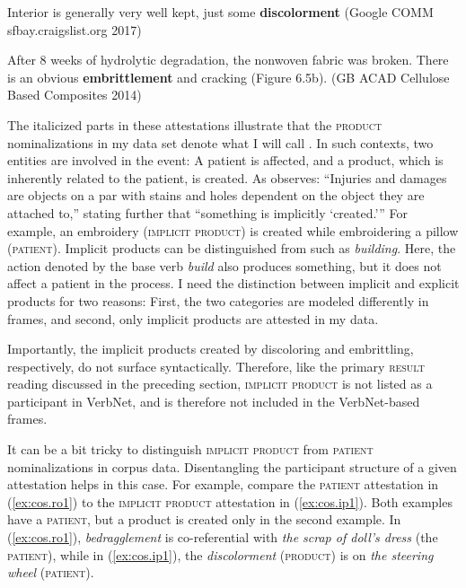 \begin{exe}
  \ex 
  \begin{xlist}
  \item \label{ex:cos.ip1}  Interior is generally very well kept, just some \textbf{discolorment}  {\small(Google COMM sfbay.craigslist.org 2017)}
  \item \label{ex:cos.ip2} After 8 weeks of hydrolytic degradation, the nonwoven fabric was broken. There is an obvious \textbf{embrittlement} and cracking  (Figure 6.5b). {\small(\acs{GB} ACAD Cellulose Based Composites 2014)}
  \end{xlist}
\end{exe}

\noindent The italicized parts in these attestations illustrate that the \textsc{product} nominalizations in my data set denote what I will call . In such contexts, two entities are involved in the event: 
A patient is affected, and a product, which is inherently related to the patient, is created. 
As \citet[264]{Osswald.2005}  observes: ``Injuries and damages are objects on a par with stains and holes  \textendash{}  dependent on the object they are attached to,'' stating further that ``something is implicitly `created.'\thinspace''
For example, an embroidery (\textsc{implicit product}) is created while embroidering a pillow (\textsc{patient}).  
Implicit products can be distinguished from  such as \textit{building}. Here, the action denoted by the base verb \textit{build} also produces something, but it does not affect a patient in the process. 
I need the distinction between implicit and explicit products for two reasons: First, the two categories are modeled differently in frames, and second, only implicit products are attested in my data.

Importantly, the implicit products created by discoloring and embrittling, respectively, do not surface syntactically. Therefore, like the primary \textsc{result} reading discussed in the preceding section, \textsc{implicit product} is not listed as a participant in VerbNet, and is therefore not included in the VerbNet-based frames. 

It can be a bit tricky to distinguish \textsc{implicit product} from \textsc{patient} nominalizations in corpus data. 
Disentangling the participant structure of a given attestation helps in this case. 
For example, compare the \textsc{patient} attestation in (\ref{ex:cos.ro1}) to the \textsc{implicit product} attestation in (\ref{ex:cos.ip1}).
Both examples have a \textsc{patient}, but a product is created only in the second example. In (\ref{ex:cos.ro1}), \textit{bedragglement} is co-referential with \textit{the scrap of doll's dress} (the \textsc{patient}), while in (\ref{ex:cos.ip1}), the \textit{discolorment} (\textsc{product}) is on \textit{the steering wheel} (\textsc{patient}). 

